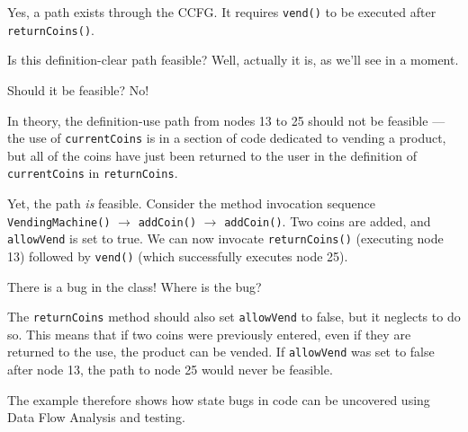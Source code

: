 
Yes, a path exists through the CCFG. It requires {\tt vend()} to be executed
after {\tt returnCoins()}. 

Is this definition-clear path feasible? Well, actually it is, as we'll see in a
moment. 

Should it be feasible? No!

In theory, the definition-use path from nodes 13 to 25 should not be feasible
--- the use of {\tt currentCoins} is in a section of code dedicated to vending a
product, but all of the coins have just been returned to the user in the
definition of {\tt currentCoins} in {\tt returnCoins}.

Yet, the path {\it is} feasible. Consider the method invocation sequence {\tt
VendingMachine()} $\rightarrow$ {\tt addCoin()} $\rightarrow$ {\tt addCoin()}.
Two coins are added, and {\tt allowVend} is set to true. We can now invocate
{\tt returnCoins()} (executing node 13) followed by {\tt vend()} (which
successfully executes node 25). 

There is a bug in the class! Where is the bug?

The {\tt returnCoins} method should also set {\tt allowVend} to false, but it
neglects to do so. This means that if two coins were previously entered, even if
they are returned to the use, the product can be vended. If {\tt allowVend} was
set to false after node 13, the path to node 25 would never be feasible.

The example therefore shows how state bugs in code can be uncovered using Data
Flow Analysis and testing. 

